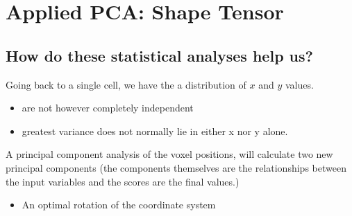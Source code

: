 \documentclass[letterpaper,10pt,english]{sphinxmanual}
\begin{document}
\noindent{}

\noindent{}


\chapter{Applied PCA: Shape Tensor}
\label{\detokenize{06-ShapeAnalysis:applied-pca-shape-tensor}}

\section{How do these statistical analyses help us?}
\label{\detokenize{06-ShapeAnalysis:how-do-these-statistical-analyses-help-us}}
\sphinxAtStartPar
Going back to a single cell, we have the a distribution of \(x\) and \(y\) values.
\begin{itemize}
\item {} 
\sphinxAtStartPar
are not however completely independent

\item {} 
\sphinxAtStartPar
greatest variance does not normally lie in either x nor y alone.

\end{itemize}

\sphinxAtStartPar
A principal component analysis of the voxel positions, will calculate two new principal components (the components themselves are the relationships between the input variables and the scores are the final values.)
\begin{itemize}
\item {} 
\sphinxAtStartPar
An optimal rotation of the coordinate system

\end{itemize}
\end{document}
